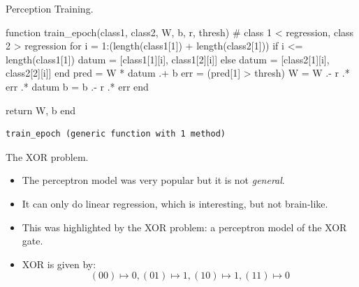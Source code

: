 \documentclass[
  ignorenonframetext,
]{beamer}
\newenvironment{Shaded}{\begin{snugshade}}{\end{snugshade}}
\newcommand{\CommentTok}[1]{\textcolor[rgb]{0.37,0.37,0.37}{#1}}
\newcommand{\ControlFlowTok}[1]{\textcolor[rgb]{0.00,0.23,0.31}{#1}}
\newcommand{\FloatTok}[1]{\textcolor[rgb]{0.68,0.00,0.00}{#1}}
\newcommand{\FunctionTok}[1]{\textcolor[rgb]{0.28,0.35,0.67}{#1}}
\newcommand{\KeywordTok}[1]{\textcolor[rgb]{0.00,0.23,0.31}{#1}}
\newcommand{\NormalTok}[1]{\textcolor[rgb]{0.00,0.23,0.31}{#1}}
\newcommand{\OperatorTok}[1]{\textcolor[rgb]{0.37,0.37,0.37}{#1}}
\begin{document}
\begin{frame}[fragile]{Perception Training.}
\protect\hypertarget{perception-training.}{}
\begin{Shaded}
\begin{Highlighting}[]
\KeywordTok{function} \FunctionTok{train\_epoch}\NormalTok{(class1, class2, W, b, r, thresh)}
    \CommentTok{\# class 1 \textless{} regression, class 2 \textgreater{} regression}
    \ControlFlowTok{for}\NormalTok{ i }\OperatorTok{=} \FloatTok{1}\OperatorTok{:}\NormalTok{(}\FunctionTok{length}\NormalTok{(class1[}\FloatTok{1}\NormalTok{]) }\OperatorTok{+} \FunctionTok{length}\NormalTok{(class2[}\FloatTok{1}\NormalTok{]))}
        \ControlFlowTok{if}\NormalTok{ i }\OperatorTok{\textless{}=} \FunctionTok{length}\NormalTok{(class1[}\FloatTok{1}\NormalTok{])}
\NormalTok{            datum }\OperatorTok{=}\NormalTok{ [class1[}\FloatTok{1}\NormalTok{][i], class1[}\FloatTok{2}\NormalTok{][i]]}
        \ControlFlowTok{else}
\NormalTok{            datum }\OperatorTok{=}\NormalTok{ [class2[}\FloatTok{1}\NormalTok{][i], class2[}\FloatTok{2}\NormalTok{][i]]}
        \ControlFlowTok{end}
\NormalTok{        pred }\OperatorTok{=}\NormalTok{ W }\OperatorTok{*}\NormalTok{ datum }\OperatorTok{.+}\NormalTok{ b}
\NormalTok{        err }\OperatorTok{=}\NormalTok{ (pred[}\FloatTok{1}\NormalTok{] }\OperatorTok{\textgreater{}}\NormalTok{ thresh)}
\NormalTok{        W }\OperatorTok{=}\NormalTok{ W }\OperatorTok{.{-}}\NormalTok{ r }\OperatorTok{.*}\NormalTok{ err }\OperatorTok{.*}\NormalTok{ datum}\OperatorTok{\textquotesingle{}}
\NormalTok{        b }\OperatorTok{=}\NormalTok{ b }\OperatorTok{.{-}}\NormalTok{ r }\OperatorTok{.*}\NormalTok{ err }
    \ControlFlowTok{end}
    
    \ControlFlowTok{return}\NormalTok{ W, b}
\KeywordTok{end}
\end{Highlighting}
\end{Shaded}

\begin{verbatim}
train_epoch (generic function with 1 method)
\end{verbatim}
\end{frame}

\begin{frame}{The XOR problem.}
\protect\hypertarget{the-xor-problem.}{}
\begin{itemize}
\item
  The perceptron model was very popular but it is not \emph{general}.
\item
  It can only do linear regression, which is interesting, but not
  brain-like.
\item
  This was highlighted by the XOR problem: a perceptron model of the XOR
  gate.
\item
  XOR is given by:
  \[(00) \mapsto 0, (01) \mapsto 1, (10) \mapsto 1, (11) \mapsto 0\]
\end{itemize}
\end{frame}
\end{document}
